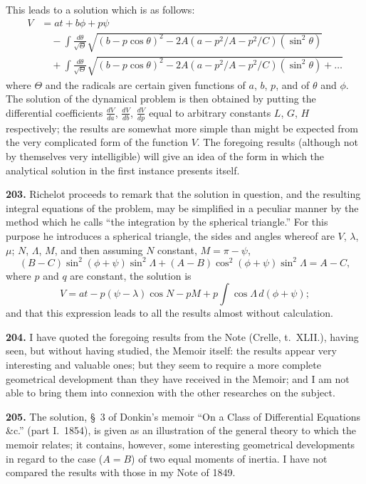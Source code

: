 \documentclass[11pt,a4paper]{book}
\begin{document}
This leads to a solution which is as follows:
\begin{align*}
V &= at + b\phi + p\psi \\
&\quad - \int\!\frac{d\theta}{\sqrt{\Theta}} \sqrt{(b - p\cos\theta)^2 - 2A(a - p^2/A - p^2/C)(\sin^2\theta)} \\
&\quad + \int\!\frac{d\theta}{\sqrt{\Theta}} \sqrt{(b - p\cos\theta)^2 - 2A(a - p^2/A - p^2/C)(\sin^2\theta) + \ldots}
\end{align*}
where $\Theta$ and the radicals are certain given functions of $a$, $b$, $p$, and of $\theta$ and $\phi$. The solution of the dynamical problem is then obtained by putting the differential coefficients $\frac{dV}{da}$, $\frac{dV}{db}$, $\frac{dV}{dp}$ equal to arbitrary constants $L$, $G$, $H$ respectively; the results are somewhat more simple than might be expected from the very complicated form of the function $V$. The foregoing results (although not by themselves very intelligible) will give an idea of the form in which the analytical solution in the first instance presents itself.

\textbf{203.} Richelot proceeds to remark that the solution in question, and the resulting integral equations of the problem, may be simplified in a peculiar manner by the method which he calls ``the integration by the spherical triangle.'' For this purpose he introduces a spherical triangle, the sides and angles whereof are $V$, $\lambda$, $\mu$; $N$, $\Lambda$, $M$, and then assuming $N$ constant, $M = \pi - \psi$,
\[
(B - C)\sin^2(\phi + \psi)\sin^2\Lambda + (A - B)\cos^2(\phi + \psi)\sin^2\Lambda = A - C,
\]
where $p$ and $q$ are constant, the solution is
\[
V = at - p(\psi - \lambda)\cos N - pM + p\int\!\cos\Lambda\,d(\phi + \psi);
\]
and that this expression leads to all the results almost without calculation.

\textbf{204.} I have quoted the foregoing results from the Note (Crelle, t.~XLII.), having seen, but without having studied, the Memoir itself: the results appear very interesting and valuable ones; but they seem to require a more complete geometrical development than they have received in the Memoir; and I am not able to bring them into connexion with the other researches on the subject.

\textbf{205.} The solution, \S~3 of Donkin's memoir ``On a Class of Differential Equations \&c.'' (part I.~1854), is given as an illustration of the general theory to which the memoir relates; it contains, however, some interesting geometrical developments in regard to the case ($A = B$) of two equal moments of inertia. I have not compared the results with those in my Note of 1849.
\end{document}
